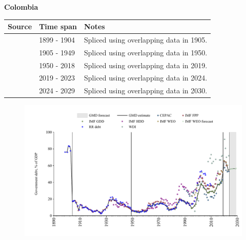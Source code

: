 \documentclass[12pt,a4paper,landscape]{article}
\begin{document}
\begin{adjustbox}{max totalsize={\paperwidth}{\paperheight},center}
\begin{minipage}[t][\textheight][t]{\textwidth}
\vspace*{0.5cm}
{}
\begin{center}
{\Large\bfseries Colombia}
\end{center}
\vspace{0.5cm}
\begin{table}[H]
\centering
\small
\begin{tabular}{|l|l|l|}
\hline
\textbf{Source} & \textbf{Time span} & \textbf{Notes} \\
\hline
\rowcolor{white}\cite{RR_debt}& 1899 - 1904 &Spliced using overlapping data in 1905.\\
\rowcolor{lightgray}\cite{IMF_FPP}& 1905 - 1949 &Spliced using overlapping data in 1950.\\
\rowcolor{white}\cite{IMF_GDD}& 1950 - 2018 &Spliced using overlapping data in 2019.\\
\rowcolor{lightgray}\cite{IMF_FPP}& 2019 - 2023 &Spliced using overlapping data in 2024.\\
\rowcolor{white}\cite{IMF_WEO_forecast}& 2024 - 2029 &Spliced using overlapping data in 2030.\\
\hline
\end{tabular}
\end{table}
\begin{figure}[H]
\centering
\includegraphics[width=\textwidth,height=0.6\textheight,keepaspectratio]{graphs/COL_govdebt_GDP.pdf}
\end{figure}
\end{minipage}
\end{adjustbox}
\end{document}
